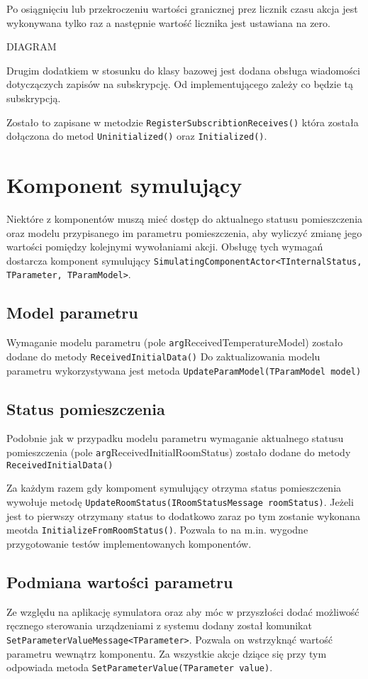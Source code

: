 Po osiągnięciu lub przekroczeniu wartości granicznej prez licznik czasu akcja jest wykonywana tylko raz a następnie wartość licznika jest ustawiana na zero.

DIAGRAM

Drugim dodatkiem w stosunku do klasy bazowej jest dodana obsługa wiadomości dotyczączych zapisów na subskrypcję. Od implementującego zależy co będzie tą subskrypcją.

Zostało to zapisane w metodzie \lstinline{RegisterSubscribtionReceives()} która została dołączona do metod \lstinline{Uninitialized()} oraz \lstinline{Initialized()}. 

\section{Komponent symulujący}
Niektóre z komponentów muszą mieć dostęp do aktualnego statusu pomieszczenia oraz modelu przypisanego im parametru pomieszczenia, aby wyliczyć zmianę jego wartości pomiędzy kolejnymi wywołaniami akcji. Obsługę tych wymagań dostarcza komponent symulujący \lstinline{SimulatingComponentActor<TInternalStatus, TParameter, TParamModel>}.

\subsection*{Model parametru}
Wymaganie modelu parametru (pole \lstinline{arg}{ReceivedTemperatureModel}) zostało dodane do metody \lstinline{ReceivedInitialData()} 
Do zaktualizowania modelu parametru wykorzystywana jest metoda \lstinline{UpdateParamModel(TParamModel model)}

\subsection*{Status pomieszczenia}
Podobnie jak w przypadku modelu parametru wymaganie aktualnego statusu pomieszczenia (pole \lstinline{arg}{ReceivedInitialRoomStatus}) zostało dodane do metody \lstinline{ReceivedInitialData()} 

Za każdym razem gdy kompoment symulujący otrzyma status pomieszczenia wywołuje metodę \lstinline{UpdateRoomStatus(IRoomStatusMessage roomStatus)}.
Jeżeli jest to pierwszy otrzymany status to dodatkowo zaraz po tym zostanie wykonana meotda \lstinline{InitializeFromRoomStatus()}. Pozwala to na m.in. wygodne przygotowanie testów implementowanych komponentów. 

\subsection{Podmiana wartości parametru}
Ze względu na aplikację symulatora oraz aby móc w przyszłości dodać możliwość ręcznego sterowania urządzeniami z systemu dodany został komunikat \lstinline{SetParameterValueMessage<TParameter>}. Pozwala on wstrzyknąć wartość parametru wewnątrz komponentu. Za wszystkie akcje dziące się przy tym odpowiada metoda \lstinline{SetParameterValue(TParameter value)}.

